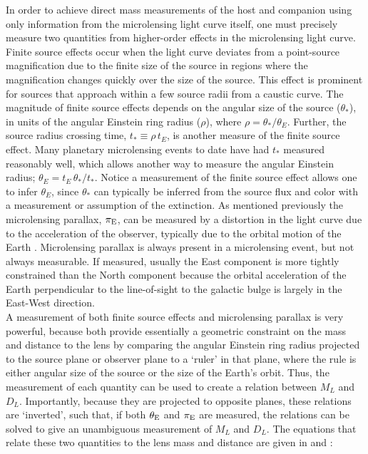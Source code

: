 \documentclass[twocolumn]{aastex631}
\begin{document}
\indent In order to achieve direct mass measurements of the host and companion using only information from the microlensing light curve itself, one must precisely measure two quantities from higher-order effects in the microlensing light curve. Finite source effects occur when the light curve deviates from a point-source magnification due to the finite size of the source in regions where the magnification changes quickly over the size of the source. This effect is prominent for sources that approach within a few source radii from a caustic curve. The magnitude of finite source effects depends on the angular size of the source ($\theta_*$), in units of
the angular Einstein ring radius ($\rho$), where $\rho = \theta_* / \theta_E$. Further, the source radius crossing time, $t_*  \equiv \rho\, t_E$, is another measure of the finite source effect. Many planetary microlensing events to date have had $t_*$ measured reasonably well, which allows another way to measure the angular Einstein radius; $\theta_E = t_E\,\theta_*/t_*$. Notice a measurement of the finite source effect allows one to infer $\theta_E$, since $\theta_*$ can typically be inferred from the source flux and color with a measurement or assumption of the extinction. As mentioned previously the microlensing parallax, $\pi_{\rm E}$, can be measured by a distortion in the light curve due to the acceleration of the observer, typically due to the orbital motion of the Earth \citep{alcock:1995a}. Microlensing parallax is always present in a microlensing event, but not always measurable. If measured, usually the East component is more tightly constrained than the North component because the orbital acceleration of the Earth perpendicular to the line-of-sight to the galactic bulge is largely in the East-West direction. \\
\indent A measurement of both finite source effects and microlensing parallax is very powerful, because both provide essentially a geometric constraint on the mass and distance to the lens by comparing the angular Einstein ring radius projected to the source plane or observer plane to a `ruler’ in that plane,  where the rule is either angular size of the source or the size of the Earth’s orbit. Thus, the measurement of each quantity can be used to create a relation between $M_L$ and $D_L$. Importantly, because they are projected to opposite planes, these relations are `inverted’, such that, if both $\theta_{\rm E}$ and $\pi_{\rm E}$ are measured, the relations can be solved to give an unambiguous measurement of $M_L$ and $D_L$. The equations that relate these two quantities to the lens mass and distance are given in \cite{bennett:2008a} and \cite{gaudi:2012a}:
\end{document}
